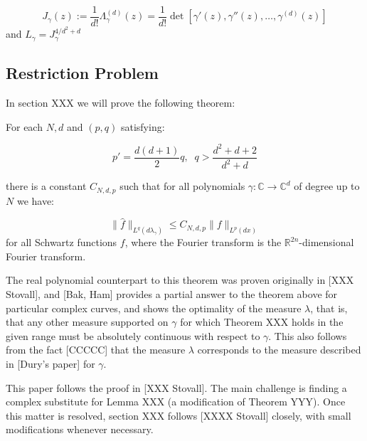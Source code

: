 	\begin{equation}
		J_\gamma(z) := \frac 1 {d!}\Lambda^{(d)}_\gamma(z) = \frac 1 {d!} \det [\gamma'(z), \gamma''(z), \dots ,\gamma^{(d)}(z)]
	\end{equation}
	and $L_\gamma = J_{\gamma}^{4/{d^2+d}}$




	\subsection{Restriction Problem} %
	\label{sub:restriction_problems}
	
	In section XXX we will prove the following theorem:

	\begin{thm}
	\label{thm:restriction}
		For each $N,d$ and $(p,q)$ satisfying:

		\begin{equation}
			p' = \frac{d(d+1)}{2} q, \;\; q> \frac{d^2+d+2}{d^2+d}
		\end{equation}

		there is a constant $C_{N,d,p}$ such that for all polynomials $\gamma: \mathbb C \to \mathbb C^d$ of degree up to $N$ we have:

		\begin{equation}
			\|\hat f\|_{L^q(d\lambda_\gamma)} \le C_{N,d,p} \|f\|_{L^p(dx)}
		\end{equation}
		for all Schwartz functions $f$, where the Fourier transform is the $\mathbb R^{2n}$-dimensional Fourier transform.
	\end{thm}

	The real polynomial counterpart to this theorem was proven originally in [XXX Stovall], and [Bak, Ham] provides a partial answer to the theorem above for particular complex curves, and shows the optimality of the measure $\lambda$, that is, that any other measure supported on $\gamma$ for which Theorem XXX holds in the given range must be absolutely continuous with respect to $\gamma$. This also follows from the fact [CCCCC] that the measure $\lambda$ corresponds to the measure described in [Dury's paper] for $\gamma$.

	This paper follows the proof in [XXX Stovall]. The main challenge is finding a complex substitute for Lemma XXX (a modification of Theorem YYY). Once this matter is resolved, section XXX follows [XXXX Stovall] closely, with small modifications whenever necessary.

